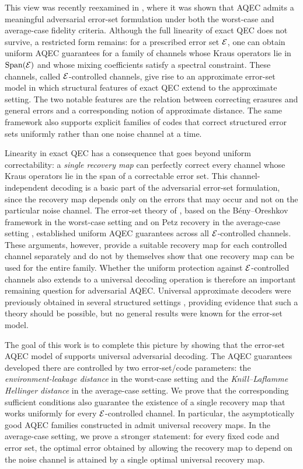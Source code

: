 \documentclass[10pt]{article}
\DeclareMathOperator{\Span}{Span}
\begin{document}
This view was recently reexamined in \cite{Elimelech2026Theory}, where it was shown that AQEC admits a meaningful adversarial error-set formulation under both the worst-case and average-case fidelity criteria. Although the full linearity of exact QEC does not survive, a restricted form remains: for a prescribed error set ${\cal E}$, one can obtain uniform AQEC guarantees for a family of channels whose Kraus operators lie in $\Span(\calE)$ and whose mixing coefficients satisfy a spectral constraint. These channels, called ${\cal E}$-controlled channels, give rise to an approximate error-set model in which structural features of exact QEC extend to the approximate setting.
The two notable features are the relation between correcting erasures and general errors and a corresponding notion of approximate distance. The same framework also supports explicit families of codes that correct structured error sets uniformly rather than one noise channel at a time.

Linearity in exact QEC has a consequence that goes beyond uniform correctability: a {\em single recovery map} can perfectly correct every channel whose Kraus operators lie in the span of a correctable error set. This channel-independent decoding is a basic part of the adversarial error-set formulation, since the recovery map depends only on the errors that may occur and not on the particular noise channel. The error-set theory of \cite{Elimelech2026Theory}, based on the B\'eny--Oreshkov framework \cite{beny2010general} in the worst-case setting and on Petz recovery in the average-case setting \cite{barnum2002reversing, zheng2024near}, established uniform AQEC guarantees across all ${\cal E}$-controlled channels. These arguments, however, provide a suitable recovery map for each controlled channel separately and do not by themselves show that one recovery map can be used for the entire family. Whether the uniform protection against ${\cal E}$-controlled channels also extends to a universal decoding operation is therefore an important remaining question for adversarial AQEC. Universal approximate decoders were previously obtained in several structured settings \cite{bergamaschi2024approaching,ma2025haar}, providing evidence that such a theory should be possible, but no general results were known for the error-set model.

The goal of this work is to complete this picture by showing that the error-set AQEC model of \cite{Elimelech2026Theory} supports universal adversarial decoding. The AQEC guarantees developed there are controlled by two error-set/code parameters: the {\em environment-leakage distance} in the worst-case setting and the {\em Knill--Laflamme Hellinger distance} in the average-case setting. We prove that the corresponding sufficient conditions also guarantee the existence of a single recovery map that works uniformly for every ${\cal E}$-controlled channel. In particular, the asymptotically good AQEC families constructed in \cite{Elimelech2026Theory} admit universal recovery maps. In the average-case setting, we prove a stronger statement: for every fixed code and error set, the optimal error obtained by allowing the recovery map to depend on the noise channel is attained by a single optimal universal recovery map.
\end{document}
